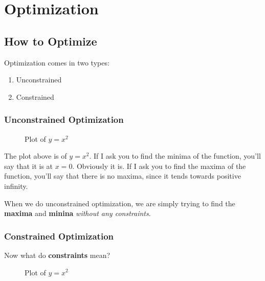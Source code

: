 \documentclass[11pt]{scrartcl}
\begin{document}
\section{Optimization}

\subsection{How to Optimize}

Optimization comes in two types:

\begin{enumerate}
	\item Unconstrained
	\item Constrained
\end{enumerate}

\subsubsection{Unconstrained Optimization}
\begin{figure}[ht!]
\centering
{}
\caption{Plot of $y = x^2$}
\end{figure}

The plot above is of $y = x^2$. If I ask you to find the minima of the function, you'll say that it is at $x=0$. Obviously it is. If I ask you to find the maxima of the function, you'll say that there is no maxima, since it tends towards positive infinity.

When we do unconstrained optimization, we are simply trying to find the \textbf{maxima} and \textbf{minina} \emph{without any constraints}. 

\subsubsection{Constrained Optimization}

Now what do \textbf{constraints} mean?

\begin{figure}[ht!]
\centering
{}
\caption{Plot of $y = x^2$}
\end{figure}
\end{document}
